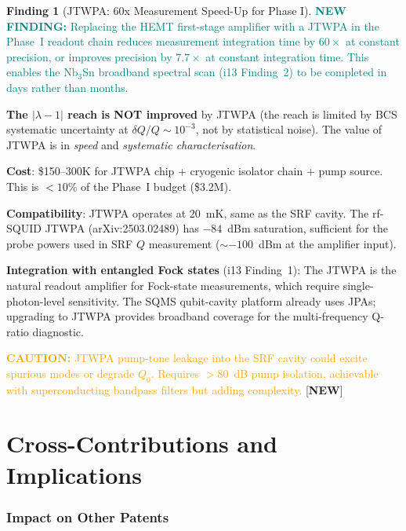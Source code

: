 \documentclass[11pt]{article}
\newcommand{\lam}{\lambda}
\newcommand{\lbone}{|\lam - 1|}
\newcommand{\caution}[1]{\textcolor{orange}{\textbf{CAUTION:} #1}}
\newcommand{\newfinding}[1]{\textcolor{teal}{\textbf{NEW FINDING:} #1}}
\theoremstyle{definition}
\newtheorem{finding}[theorem]{Finding}
\theoremstyle{remark}
\begin{document}
\begin{finding}[JTWPA: 60x Measurement Speed-Up for Phase I]
\label{find:JTWPA}
\newfinding{Replacing the HEMT first-stage amplifier with a JTWPA
in the Phase~I readout chain reduces measurement integration time
by $60\times$ at constant precision, or improves precision by
$7.7\times$ at constant integration time. This enables the Nb$_3$Sn
broadband spectral scan (i13 Finding~2) to be completed in days
rather than months.}

\textbf{The $\lbone$ reach is NOT improved} by JTWPA (the reach is
limited by BCS systematic uncertainty at $\delta Q/Q \sim 10^{-3}$,
not by statistical noise). The value of JTWPA is in \emph{speed}
and \emph{systematic characterisation}.

\textbf{Cost}: \$150--300K for JTWPA chip + cryogenic isolator chain
+ pump source. This is $< 10\%$ of the Phase~I budget (\$3.2M).

\textbf{Compatibility}: JTWPA operates at 20~mK, same as the SRF
cavity. The rf-SQUID JTWPA (arXiv:2503.02489) has $-84$~dBm
saturation, sufficient for the probe powers used in SRF $Q$
measurement ($\sim -100$~dBm at the amplifier input).

\textbf{Integration with entangled Fock states} (i13 Finding~1):
The JTWPA is the natural readout amplifier for Fock-state measurements,
which require single-photon-level sensitivity. The SQMS qubit-cavity
platform already uses JPAs; upgrading to JTWPA provides broadband
coverage for the multi-frequency Q-ratio diagnostic.

\caution{JTWPA pump-tone leakage into the SRF cavity could excite
spurious modes or degrade $Q_0$. Requires $> 80$~dB pump isolation,
achievable with superconducting bandpass filters but adding complexity.}
[\textbf{NEW}]
\end{finding}


\part{Cross-Contributions and Implications}
\label{part:cross}

\section{Impact on Other Patents}
\end{document}
